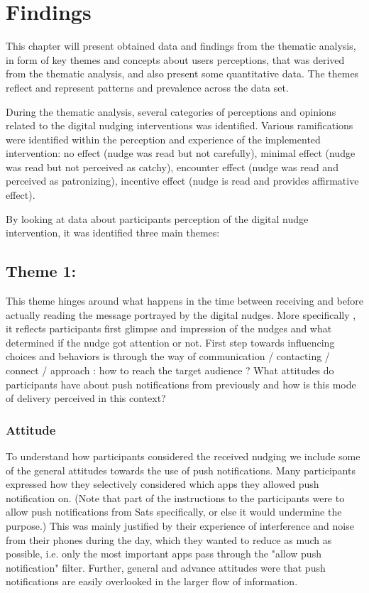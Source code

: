 \chapter{Findings}
This chapter will present obtained data and findings from the thematic analysis, in form of key themes and concepts about users perceptions, that was derived from the thematic analysis, and also present some quantitative data. The themes reflect and represent patterns and prevalence across the data set. 

During the thematic analysis, several categories of perceptions and opinions related to the digital nudging interventions was identified. Various ramifications were identified within the perception and experience of the implemented intervention: no effect (nudge was read but not carefully), minimal effect (nudge was read but not perceived as catchy), encounter effect (nudge was read and perceived as patronizing), incentive effect (nudge is read and provides affirmative effect).

By looking at data about participants perception of the digital nudge intervention, it was identified three main themes:

\section{Theme 1: }
This theme hinges around what happens in the time between receiving and before actually reading the message portrayed by the digital nudges. More specifically , it reflects participants first glimpse and impression of the nudges and what determined if the nudge got attention or not. First step towards influencing choices and behaviors is through the way of communication / contacting / connect / approach : how to reach the target audience ? What attitudes do participants have about push notifications from previously  and how is this mode of delivery perceived in this context? 

\subsection{Attitude}
To understand how participants considered the received nudging we include some of the general attitudes towards the use of push notifications. Many participants expressed how they selectively considered which apps they allowed push notification on. (Note that part of the instructions to the participants were to allow push notifications from Sats specifically, or else it would undermine the purpose.) This was mainly justified by their experience of interference and noise from their phones during the day, which they wanted to reduce as much as possible, i.e. only the most important apps pass through the "allow push notification" filter. Further, general and advance attitudes were that push notifications are easily overlooked in the larger flow of information. 

